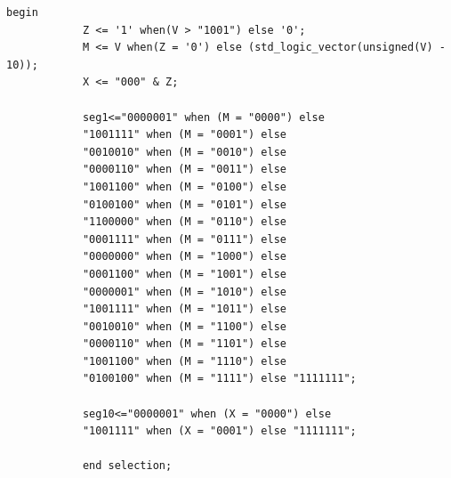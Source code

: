 \begin{enumerate}
\begin{lstlisting}[caption={BCD til to 7 segment decoder},label={lst:bcdToTwo7SegDecoder}]
			begin
			Z <= '1' when(V > "1001") else '0';
			M <= V when(Z = '0') else (std_logic_vector(unsigned(V) - 10));  
			X <= "000" & Z;
			
			seg1<="0000001" when (M = "0000") else
			"1001111" when (M = "0001") else
			"0010010" when (M = "0010") else
			"0000110" when (M = "0011") else
			"1001100" when (M = "0100") else
			"0100100" when (M = "0101") else
			"1100000" when (M = "0110") else
			"0001111" when (M = "0111") else
			"0000000" when (M = "1000") else
			"0001100" when (M = "1001") else
			"0000001" when (M = "1010") else
			"1001111" when (M = "1011") else
			"0010010" when (M = "1100") else
			"0000110" when (M = "1101") else
			"1001100" when (M = "1110") else
			"0100100" when (M = "1111") else "1111111";
			
			seg10<="0000001" when (X = "0000") else
			"1001111" when (X = "0001") else "1111111";
			
			end selection;
			\end{lstlisting}
	
\end{enumerate}